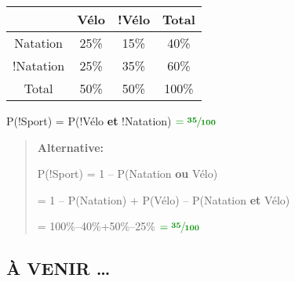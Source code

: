 \documentclass[french]{article}
\begin{document}
\begin{center}
\begin{tabular}{|c|c|c|c|}
\hline
 & Vélo & !Vélo & Total\\
\hline
Natation & 25\% & 15\% & 40\%\\
\hline
!Natation & 25\% & 35\% & 60\%\\
\hline
Total & 50\% & 50\% & 100\%\\
\hline
\end{tabular}
\end{center}

P(!Sport) = P(!Vélo \textbf{et} !Natation) \(\textcolor{luckydarkgreen}{\mathbf{= \sfrac{35}{100}}}\)

\begin{quote}
\textbf{Alternative:}

P(!Sport) = 1 -- P(Natation \textbf{ou} Vélo)

= 1 -- P(Natation) + P(Vélo) -- P(Natation \textbf{et} Vélo)

= 100\%--40\%+50\%--25\% \(\textcolor{luckydarkgreen}{\mathbf{= \sfrac{35}{100}}}\)
\end{quote}

\subsection{À VENIR \ldots{}}
\label{sec:org466b8e9}
\end{document}
